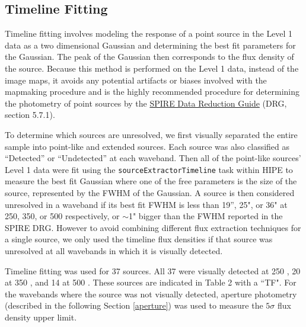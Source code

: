 \subsection{Timeline Fitting}\label{timeline}
Timeline fitting involves modeling the response of a point source in the Level 1 data as a two dimensional Gaussian and determining the best fit parameters for the Gaussian. The peak of the Gaussian then corresponds to the flux density of the source. Because this method is performed on the Level 1 data, instead of the image maps, it avoids any potential artifacts or biases involved with the mapmaking procedure and is the highly recommended procedure for determining the photometry of point sources by the \href{http://herschel.esac.esa.int/hcss-doc-11.0/index.jsp\#spire_drg:_start}{SPIRE Data Reduction Guide} (DRG, section 5.7.1).

To determine which sources are unresolved, we first visually separated the entire sample into point-like and extended sources. Each source was also classified as ``Detected'' or ``Undetected'' at each waveband. Then all of the point-like sources' Level 1 data were fit using the \texttt{sourceExtractorTimeline} task within HIPE to measure the best fit Gaussian where one of the free parameters is the size of the source, represented by the FWHM of the Gaussian. A source is then considered unresolved in a waveband if its best fit FWHM is less than 19'', 25", or 36" at 250, 350, or 500 \micron{} respectively, or $\sim$1" bigger than the FWHM reported in the SPIRE DRG. However to avoid combining different flux extraction techniques for a single source, we only used the timeline flux densities if that source was unresolved at all wavebands in which it is visually detected.

Timeline fitting was used for 37 sources. All 37 were visually detected at 250 \um{}, 20 at 350 \um{}, and 14 at 500 \um. These sources are indicated in Table 2 with a ``TF". For the wavebands where the source was not visually detected, aperture photometry (described in the following Section \ref{aperture}) was used to measure the $5\sigma$ flux density upper limit.